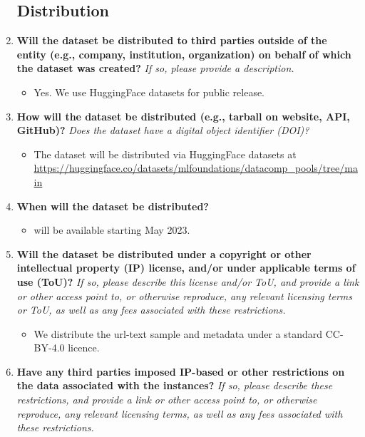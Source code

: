 \begin{enumerate}[label=Q\arabic*]
\subsection{Distribution}

\item \textbf{Will the dataset be distributed to third parties outside of the entity (e.g., company, institution, organization) on behalf of which the dataset was created?} \textit{If so, please provide a description.}

\begin{itemize}
\item Yes. We use HuggingFace datasets for public release.
\end{itemize}

\item \textbf{How will the dataset be distributed (e.g., tarball on website, API, GitHub)?} \textit{Does the dataset have a digital object identifier (DOI)?}

\begin{itemize}
\item The dataset will be distributed via HuggingFace datasets at \href{https://huggingface.co/datasets/mlfoundations/datacomp_pools/tree/main}{\url{https://huggingface.co/datasets/mlfoundations/datacomp_pools/tree/main}}
\end{itemize}

\item \textbf{When will the dataset be distributed?}

\begin{itemize}
\item \datanet will be available starting May 2023.
\end{itemize}

\item \textbf{Will the dataset be distributed under a copyright or other intellectual property (IP) license, and/or under applicable terms of use (ToU)?} \textit{If so, please describe this license and/or ToU, and provide a link or other access point to, or otherwise reproduce, any relevant licensing terms or ToU, as well as any fees associated with these restrictions.}

\begin{itemize}
\item We distribute the url-text sample and metadata under a standard CC-BY-4.0 licence.
\end{itemize}

\item \textbf{Have any third parties imposed IP-based or other restrictions on the data associated with the instances?} \textit{If so, please describe these restrictions, and provide a link or other access point to, or otherwise reproduce, any relevant licensing terms, as well as any fees associated with these restrictions.}


\end{enumerate}
